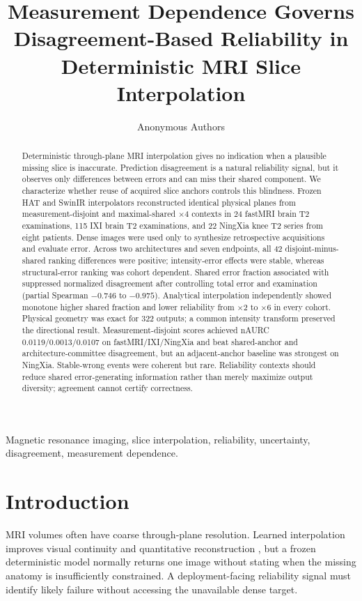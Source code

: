 \documentclass[journal,10pt]{IEEEtran}
\begin{document}
\title{Measurement Dependence Governs Disagreement-Based Reliability in Deterministic MRI Slice Interpolation}
\author{Anonymous Authors}
\maketitle

\begin{abstract}
Deterministic through-plane MRI interpolation gives no indication when a plausible missing slice is inaccurate. Prediction disagreement is a natural reliability signal, but it observes only differences between errors and can miss their shared component. We characterize whether reuse of acquired slice anchors controls this blindness. Frozen HAT and SwinIR interpolators reconstructed identical physical planes from measurement-disjoint and maximal-shared $\times4$ contexts in 24 fastMRI brain T2 examinations, 115 IXI brain T2 examinations, and 22 NingXia knee T2 series from eight patients. Dense images were used only to synthesize retrospective acquisitions and evaluate error. Across two architectures and seven endpoints, all 42 disjoint-minus-shared ranking differences were positive; intensity-error effects were stable, whereas structural-error ranking was cohort dependent. Shared error fraction associated with suppressed normalized disagreement after controlling total error and examination (partial Spearman $-0.746$ to $-0.975$). Analytical interpolation independently showed monotone higher shared fraction and lower reliability from $\times2$ to $\times6$ in every cohort. Physical geometry was exact for 322 outputs; a common intensity transform preserved the directional result. Measurement-disjoint scores achieved nAURC 0.0119/0.0013/0.0107 on fastMRI/IXI/NingXia and beat shared-anchor and architecture-committee disagreement, but an adjacent-anchor baseline was strongest on NingXia. Stable-wrong events were coherent but rare. Reliability contexts should reduce shared error-generating information rather than merely maximize output diversity; agreement cannot certify correctness.
\end{abstract}

\begin{IEEEkeywords}
Magnetic resonance imaging, slice interpolation, reliability, uncertainty, disagreement, measurement dependence.
\end{IEEEkeywords}

\section{Introduction}
 MRI volumes often have coarse through-plane resolution. Learned interpolation improves visual continuity and quantitative reconstruction \cite{peng2020saint,song2024i3net}, but a frozen deterministic model normally returns one image without stating when the missing anatomy is insufficiently constrained. A deployment-facing reliability signal must identify likely failure without accessing the unavailable dense target.
\end{document}
